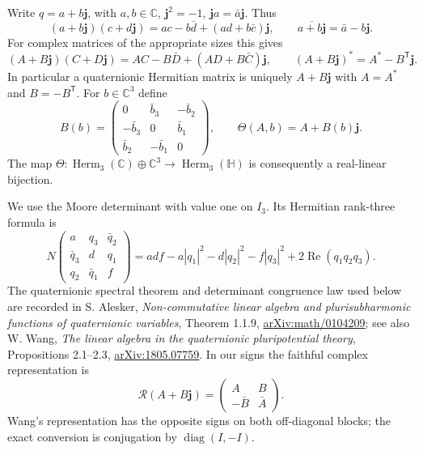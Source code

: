Write $q=a+b\mathbf j$, with $a,b\in\mathbb C$,
$\mathbf j^2=-1$, $\mathbf ja=\bar a\mathbf j$. Thus
\[
 (a+b\mathbf j)(c+d\mathbf j)
 =ac-b\bar d+(ad+b\bar c)\mathbf j,
 \qquad \overline{a+b\mathbf j}=\bar a-b\mathbf j.
\]
For complex matrices of the appropriate sizes this gives
\[
 (A+B\mathbf j)(C+D\mathbf j)
 =AC-B\bar D+(AD+B\bar C)\mathbf j,
 \qquad (A+B\mathbf j)^*=A^*-B^{\mathsf T}\mathbf j.
\]
In particular a quaternionic Hermitian matrix is uniquely $A+B\mathbf j$
with $A=A^*$ and $B=-B^{\mathsf T}$. For $b\in\mathbb C^3$ define
\[
 B(b)=\begin{pmatrix}
 0&\bar b_3&-\bar b_2\\
 -\bar b_3&0&\bar b_1\\
 \bar b_2&-\bar b_1&0
 \end{pmatrix},\qquad \Theta(A,b)=A+B(b)\mathbf j.
\]
The map $\Theta:\operatorname{Herm}_3(\mathbb C)\oplus\mathbb C^3
\to\operatorname{Herm}_3(\mathbb H)$ is consequently a real-linear bijection.

We use the Moore determinant with value one on $I_3$. Its Hermitian
rank-three formula is
\begin{equation}\label{q444:moore}
 N\begin{pmatrix}
 a&q_3&\bar q_2\\ \bar q_3&d&q_1\\q_2&\bar q_1&f
 \end{pmatrix}
 =adf-a|q_1|^2-d|q_2|^2-f|q_3|^2
       +2\operatorname{Re}(q_1q_2q_3).
\end{equation}
The quaternionic spectral theorem and determinant congruence law used below
are recorded in S. Alesker, \emph{Non-commutative linear algebra and
plurisubharmonic functions of quaternionic variables}, Theorem 1.1.9,
\href{https://arxiv.org/abs/math/0104209}{arXiv:math/0104209}; see also
W. Wang, \emph{The linear algebra in the quaternionic pluripotential theory},
Propositions 2.1--2.3,
\href{https://arxiv.org/abs/1805.07759}{arXiv:1805.07759}.
In our signs the faithful complex representation is
\[
 \mathcal R(A+B\mathbf j)=
 \begin{pmatrix}A&B\\-\bar B&\bar A\end{pmatrix}.
\]
Wang's representation has the opposite signs on both off-diagonal blocks;
the exact conversion is conjugation by $\operatorname{diag}(I,-I)$.

